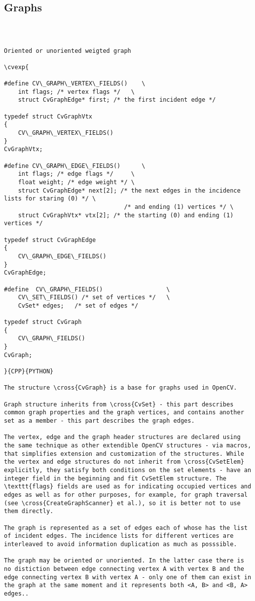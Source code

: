 \subsection{Graphs}
\begin{verbatim}


\end{verbatim}
\begin{verbatim}

Oriented or unoriented weigted graph

\cvexp{

#define CV\_GRAPH\_VERTEX\_FIELDS()    \
    int flags; /* vertex flags */   \
    struct CvGraphEdge* first; /* the first incident edge */

typedef struct CvGraphVtx
{
    CV\_GRAPH\_VERTEX\_FIELDS()
}
CvGraphVtx;

#define CV\_GRAPH\_EDGE\_FIELDS()      \
    int flags; /* edge flags */     \
    float weight; /* edge weight */ \
    struct CvGraphEdge* next[2]; /* the next edges in the incidence lists for staring (0) */ \
                                  /* and ending (1) vertices */ \
    struct CvGraphVtx* vtx[2]; /* the starting (0) and ending (1) vertices */

typedef struct CvGraphEdge
{
    CV\_GRAPH\_EDGE\_FIELDS()
}
CvGraphEdge;

#define  CV\_GRAPH\_FIELDS()                  \
    CV\_SET\_FIELDS() /* set of vertices */   \
    CvSet* edges;   /* set of edges */

typedef struct CvGraph
{
    CV\_GRAPH\_FIELDS()
}
CvGraph;

}{CPP}{PYTHON}

The structure \cross{CvGraph} is a base for graphs used in OpenCV.

Graph structure inherits from \cross{CvSet} - this part describes common graph properties and the graph vertices, and contains another set as a member - this part describes the graph edges.

The vertex, edge and the graph header structures are declared using the same technique as other extendible OpenCV structures - via macros, that simplifies extension and customization of the structures. While the vertex and edge structures do not inherit from \cross{CvSetElem} explicitly, they satisfy both conditions on the set elements - have an integer field in the beginning and fit CvSetElem structure. The \texttt{flags} fields are used as for indicating occupied vertices and edges as well as for other purposes, for example, for graph traversal (see \cross{CreateGraphScanner} et al.), so it is better not to use them directly.

The graph is represented as a set of edges each of whose has the list of incident edges. The incidence lists for different vertices are interleaved to avoid information duplication as much as posssible.

The graph may be oriented or unoriented. In the latter case there is no distiction between edge connecting vertex A with vertex B and the edge connecting vertex B with vertex A - only one of them can exist in the graph at the same moment and it represents both <A, B> and <B, A> edges..


\end{verbatim}
